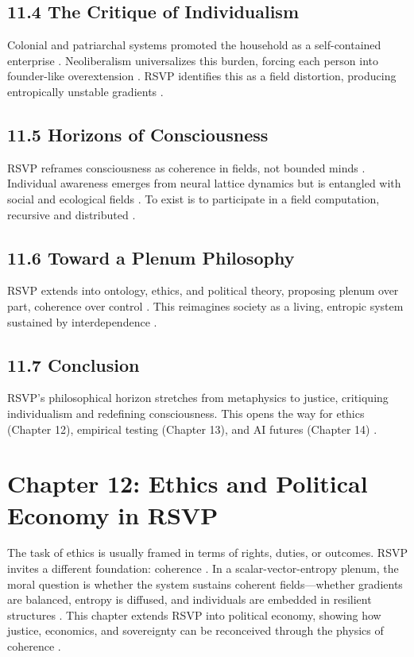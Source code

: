 \documentclass[12pt]{article}
\begin{document}
\subsection*{11.4 The Critique of Individualism}
Colonial and patriarchal systems promoted the household as a self-contained enterprise \citep{ortega1957}. Neoliberalism universalizes this burden, forcing each person into founder-like overextension \citep{zuboff2019}. RSVP identifies this as a field distortion, producing entropically unstable gradients \citep{shannon1948}.
\subsection*{11.5 Horizons of Consciousness}
RSVP reframes consciousness as coherence in fields, not bounded minds \citep{tononi2004}. Individual awareness emerges from neural lattice dynamics but is entangled with social and ecological fields \citep{hohwy2013}. To exist is to participate in a field computation, recursive and distributed \citep{whitehead1978}.
\subsection*{11.6 Toward a Plenum Philosophy}
RSVP extends into ontology, ethics, and political theory, proposing plenum over part, coherence over control \citep{deleuze1987}. This reimagines society as a living, entropic system sustained by interdependence \citep{ortega1957}.
\subsection*{11.7 Conclusion}
RSVP's philosophical horizon stretches from metaphysics to justice, critiquing individualism and redefining consciousness. This opens the way for ethics (Chapter 12), empirical testing (Chapter 13), and AI futures (Chapter 14) \citep{whitehead1978}.
\section*{Chapter 12: Ethics and Political Economy in RSVP}
The task of ethics is usually framed in terms of rights, duties, or outcomes. RSVP invites a different foundation: coherence \citep{whitehead1978}. In a scalar-vector-entropy plenum, the moral question is whether the system sustains coherent fields---whether gradients are balanced, entropy is diffused, and individuals are embedded in resilient structures \citep{ortega1957}. This chapter extends RSVP into political economy, showing how justice, economics, and sovereignty can be reconceived through the physics of coherence \citep{deleuze1987}.
\end{document}

